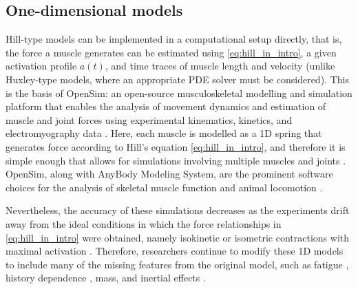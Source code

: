\documentclass{sfuthesis}
\numberwithin{equation}{section}
\numberwithin{figure}{chapter}
\numberwithin{table}{chapter}
\theoremstyle{definition}
\begin{document}
\subsection{One-dimensional models}

Hill-type models can be implemented in a computational setup directly, that is, the force a muscle generates can be estimated using \eqref{eq:hill_in_intro}, a given activation profile $a(t)$, and time traces of muscle length and velocity (unlike Huxley-type models, where an appropriate PDE solver must be considered). This is the basis of OpenSim:
an open-source musculoskeletal modelling and simulation platform that enables the analysis of movement dynamics and estimation of muscle and joint forces using experimental kinematics, kinetics, and electromyography data \cite{Delp2007OpenSim}. Here, each muscle is modelled as a 1D spring that generates force according to Hill's equation \eqref{eq:hill_in_intro}, and therefore it is simple enough that allows for simulations involving multiple muscles and joints \cite{BishopEtAl2021Dinosaurs, Porsa2016DirectMethodsOpenSim, RajagopalEtAl2016FullBody, StarkEtAl2021Dogs}. OpenSim, along with AnyBody Modeling System\texttrademark, are the prominent software choices for the analysis of skeletal muscle function and animal locomotion \cite{Gautam2024AnybodyOpensim}.

Nevertheless, the accuracy of these simulations decreases as the experiments drift away from the ideal conditions in which the force relationships in \eqref{eq:hill_in_intro} were obtained, namely isokinetic or isometric contractions with maximal activation \cite{Dick2017, Lee2013AccuracyofGastrocForces, MillardEtAl2013, Perreault2003HillErrors}.  Therefore, researchers continue to modify these 1D models to include many of the missing features from the original model, such as fatigue \cite{Pereira2011Fatigue1D}, history dependence \cite{McGowanEtAl2013,Ross2018}, mass, and inertial effects \cite{Gunther2012,Ross2018,RossWakeling2016Multibody,Paper4_RossWakeling2021}.
\end{document}
